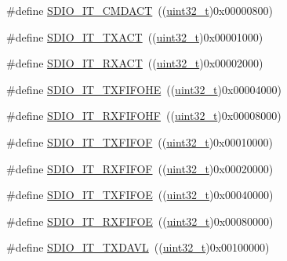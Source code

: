 \begin{DoxyCompactItemize}
\item 
\#define \hyperlink{group___s_d_i_o___interrupt__sources_gae73ae9bc72eaeedc2a37221697bc33e2}{S\+D\+I\+O\+\_\+\+I\+T\+\_\+\+C\+M\+D\+A\+CT}~((\hyperlink{_p_e___types_8h_a33594304e786b158f3fb30289278f5af}{uint32\+\_\+t})0x00000800)
\item 
\#define \hyperlink{group___s_d_i_o___interrupt__sources_ga811e683588ab887abb0101defafdb51e}{S\+D\+I\+O\+\_\+\+I\+T\+\_\+\+T\+X\+A\+CT}~((\hyperlink{_p_e___types_8h_a33594304e786b158f3fb30289278f5af}{uint32\+\_\+t})0x00001000)
\item 
\#define \hyperlink{group___s_d_i_o___interrupt__sources_ga1d9a59a2415b57bdf9827423cb6ce3a0}{S\+D\+I\+O\+\_\+\+I\+T\+\_\+\+R\+X\+A\+CT}~((\hyperlink{_p_e___types_8h_a33594304e786b158f3fb30289278f5af}{uint32\+\_\+t})0x00002000)
\item 
\#define \hyperlink{group___s_d_i_o___interrupt__sources_gaf538ae7dd73d55e76069e8710858038a}{S\+D\+I\+O\+\_\+\+I\+T\+\_\+\+T\+X\+F\+I\+F\+O\+HE}~((\hyperlink{_p_e___types_8h_a33594304e786b158f3fb30289278f5af}{uint32\+\_\+t})0x00004000)
\item 
\#define \hyperlink{group___s_d_i_o___interrupt__sources_gadcbc1a0de8b9df83b5c6c839b4739c87}{S\+D\+I\+O\+\_\+\+I\+T\+\_\+\+R\+X\+F\+I\+F\+O\+HF}~((\hyperlink{_p_e___types_8h_a33594304e786b158f3fb30289278f5af}{uint32\+\_\+t})0x00008000)
\item 
\#define \hyperlink{group___s_d_i_o___interrupt__sources_ga3ec471bd9233561d6e929ebac6362b75}{S\+D\+I\+O\+\_\+\+I\+T\+\_\+\+T\+X\+F\+I\+F\+OF}~((\hyperlink{_p_e___types_8h_a33594304e786b158f3fb30289278f5af}{uint32\+\_\+t})0x00010000)
\item 
\#define \hyperlink{group___s_d_i_o___interrupt__sources_gae60a1d8e5a7caff85d84e513b093b8a8}{S\+D\+I\+O\+\_\+\+I\+T\+\_\+\+R\+X\+F\+I\+F\+OF}~((\hyperlink{_p_e___types_8h_a33594304e786b158f3fb30289278f5af}{uint32\+\_\+t})0x00020000)
\item 
\#define \hyperlink{group___s_d_i_o___interrupt__sources_gabff1466c2f2effbe30b80a11c132d7c0}{S\+D\+I\+O\+\_\+\+I\+T\+\_\+\+T\+X\+F\+I\+F\+OE}~((\hyperlink{_p_e___types_8h_a33594304e786b158f3fb30289278f5af}{uint32\+\_\+t})0x00040000)
\item 
\#define \hyperlink{group___s_d_i_o___interrupt__sources_ga80b01aaf64c873d21bfa95e5d98d8766}{S\+D\+I\+O\+\_\+\+I\+T\+\_\+\+R\+X\+F\+I\+F\+OE}~((\hyperlink{_p_e___types_8h_a33594304e786b158f3fb30289278f5af}{uint32\+\_\+t})0x00080000)
\item 
\#define \hyperlink{group___s_d_i_o___interrupt__sources_gac8e5744e6d977182a6fc7484a6f1195e}{S\+D\+I\+O\+\_\+\+I\+T\+\_\+\+T\+X\+D\+A\+VL}~((\hyperlink{_p_e___types_8h_a33594304e786b158f3fb30289278f5af}{uint32\+\_\+t})0x00100000)

\end{DoxyCompactItemize}
